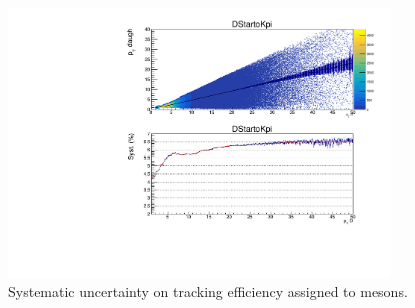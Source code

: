 \begin{figure}[tb]
\begin{center}
 \includegraphics[width=0.9\textwidth]{figures/Dstar/pp13TeV/Dstar-ME-eff-final.pdf}
\caption{Systematic uncertainty on tracking efficiency assigned to \Dstar mesons.}
\label{fig:DzeroTrackSyst}
\end{center}
\end{figure}




